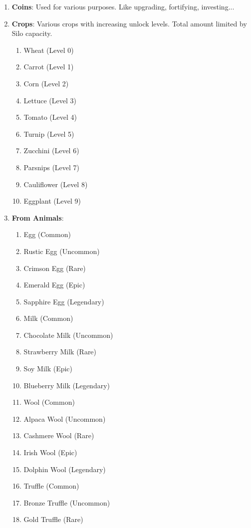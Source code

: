 \documentclass[12pt]{article}
\begin{document}
\begin{enumerate}
    \item \textbf{Coins}: Used for various purposes. Like upgrading, fortifying, investing...
    \item \textbf{Crops}: Various crops with increasing unlock levels. Total amount limited by Silo capacity.
    \begin{enumerate}
        \item Wheat (Level 0)
        \item Carrot (Level 1)
        \item Corn (Level 2)
        \item Lettuce (Level 3)
        \item Tomato (Level 4)
        \item Turnip (Level 5)
        \item Zucchini (Level 6)
        \item Parsnips (Level 7)
        \item Cauliflower (Level 8)
        \item Eggplant (Level 9)
    \end{enumerate}
    \item \textbf{From Animals}:
    \begin{enumerate}
        \item Egg (Common)
        \item Rustic Egg (Uncommon)
        \item Crimson Egg (Rare)
        \item Emerald Egg (Epic)
        \item Sapphire Egg (Legendary)
        \item Milk (Common)
        \item Chocolate Milk (Uncommon)
        \item Strawberry Milk (Rare)
        \item Soy Milk (Epic)
        \item Blueberry Milk (Legendary)
        \item Wool (Common)
        \item Alpaca Wool (Uncommon)
        \item Cashmere Wool (Rare)
        \item Irish Wool (Epic)
        \item Dolphin Wool (Legendary)
        \item Truffle (Common)
        \item Bronze Truffle (Uncommon)
        \item Gold Truffle (Rare)

\end{enumerate}
\end{enumerate}
\end{document}

